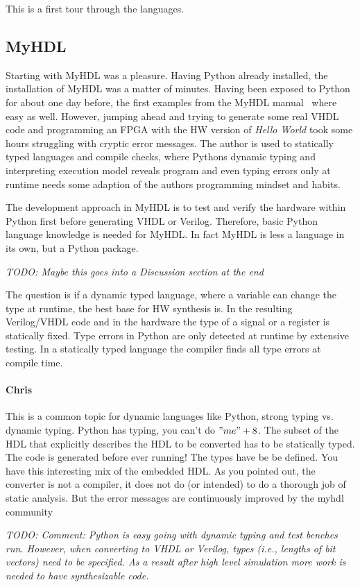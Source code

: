 \documentclass[10pt, technote, draftcls, onecolumn]{IEEEtran}
\newcommand{\todo}[1]{{\emph{TODO: #1}}}
\newcommand{\comment}[3]{\paragraph*{\textbf{#1}}{\color{#3}#2}}
\newcommand{\cfelton}[1]{\comment{Chris}{#1}{Blue}}
\begin{document}
This is a first tour through the languages.

\subsection{MyHDL}

Starting with MyHDL was a pleasure. Having Python already installed, the installation
of MyHDL was a matter of minutes. Having been exposed to Python for about one
day before, the first examples from the MyHDL manual~\cite{myhdl:2010} where easy as well.
However, jumping ahead and trying to generate some real VHDL code and programming
an FPGA with the HW version of \emph{Hello World} took some hours struggling
with cryptic error messages. The author is used to statically typed languages and
compile checks, where Pythons dynamic typing and interpreting execution model
reveals program and even typing errors only at runtime needs some adaption of
the authors programming mindset and habits.

The development approach in MyHDL is to test and verify the hardware within Python first
before generating VHDL or Verilog. Therefore, basic Python language knowledge is
needed for MyHDL. In fact MyHDL is less a language in its own, but a Python package.

\todo{Maybe this goes into a Discussion section at the end}

The question is if a dynamic typed language, where a variable can change the type
at runtime, the best base for HW synthesis is. In the resulting Verilog/VHDL code and
in the hardware the type of a signal or a register is statically fixed. Type errors in
Python are only detected at runtime by extensive testing. In a statically typed
language the compiler finds all type errors at compile time.

\cfelton{This is a common topic for dynamic languages like Python, strong typing
vs. dynamic typing.  Python has typing, you can't do $"me"+8$.  The subset of 
the HDL that explicitly describes the HDL to be converted has to be statically
typed.  The code is generated before ever running!  The types have be be defined.
You have this interesting mix of the embedded HDL.  As you pointed out, the converter
is not a compiler, it does not do (or intended) to do a thorough job of static 
analysis.  But the error messages are continuously improved by the myhdl community}

\todo{Comment: Python is easy going with dynamic typing and test benches run.
However, when converting to VHDL or Verilog, types (i.e., lengths of bit vectors)
need to be specified. As a result after high level simulation more work is needed
to have synthesizable code.}
\end{document}
